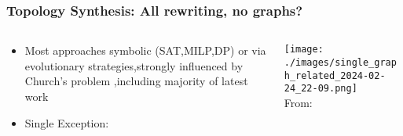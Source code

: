 \documentclass[./presentation.tex]{subfiles}
\begin{document}
\begin{frame}[label=ruletograph,c]
\frametitle{Topology Synthesis: All rewriting, no graphs?}
\vspace{-0.8cm}
\small
\begin{columns}
  \begin{column}{0.5\textwidth}
     \begin{itemize}
          \item Most approaches symbolic (SAT,MILP,DP) or via evolutionary strategies,strongly influenced by Church's problem ,including majority of latest work\footnotemark[1]  %
        
          \item Single Exception: \cite{fanSpecificationTopologyAutomatic2021d}
     \end{itemize}
  \end{column}%
  \begin{column}{0.5\textwidth}
  \centering
  \texttt{[image: ./images/single\_graph\_related\_2024-02-24\_22-09.png]}\\
  From: \cite{fanSpecificationTopologyAutomatic2021d}
  \end{column}
\end{columns}
\end{frame}
\end{document}
